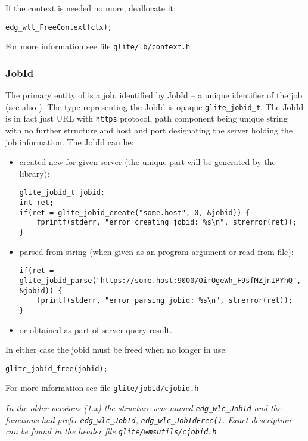 %
If the context is needed no more, deallocate it:
\begin{lstlisting}
edg_wll_FreeContext(ctx);
\end{lstlisting}

For more information see file \verb'glite/lb/context.h'

\subsubsection{JobId}
The primary entity of \LB is a job, identified by JobId -- a unique
identifier of the job (see also \cite{lbug}). The type representing
the JobId is opaque \verb'glite_jobid_t'. The JobId is in fact
just URL with \verb'https' protocol, path component being unique string
with no further structure and host and port designating the \LB server
holding the job information. The JobId can be:
\begin{itemize}
\item created new for given \LB server (the unique part will be
generated by the \LB library):
\begin{lstlisting}
glite_jobid_t jobid;
int ret;
if(ret = glite_jobid_create("some.host", 0, &jobid)) {
	fprintf(stderr, "error creating jobid: %s\n", strerror(ret));
}
\end{lstlisting}
\item parsed from string (\eg when given as an program argument or
read from file):
\begin{lstlisting}[firstnumber=3]
if(ret = glite_jobid_parse("https://some.host:9000/OirOgeWh_F9sfMZjnIPYhQ", &jobid)) {
	fprintf(stderr, "error parsing jobid: %s\n", strerror(ret));
}
\end{lstlisting}
\item or obtained as part of \LB server query result.
\end{itemize}
In either case the jobid must be freed when no longer in use:
\begin{lstlisting}
glite_jobid_free(jobid);
\end{lstlisting}

For more information see file \verb'glite/jobid/cjobid.h'

%
{\it In the older \LB versions (1.x) the
structure was named \verb'edg_wlc_JobId' and the functions had prefix
\verb'edg_wlc_JobId', \eg\verb'edg_wlc_JobIdFree()'. Exact description
can be found in the header file \verb'glite/wmsutils/cjobid.h'}


